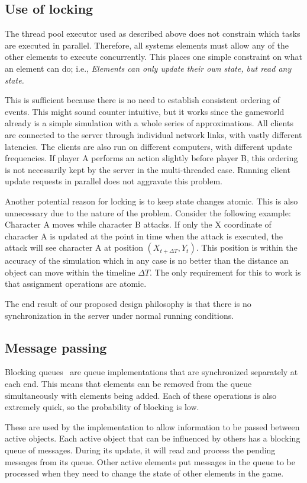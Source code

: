 \subsection{Use of locking}
The thread pool executor used as described above does not constrain
which tasks are executed in parallel. Therefore, all systems elements
must allow any of the other elements to execute concurrently. This
places one simple constraint on what an element can do; i.e., 
\emph{Elements can only update their own state, but read any state.}

This is sufficient because there is no need to establish consistent
ordering of events. This might sound counter intuitive, but it works since
the gameworld already is a simple simulation with a whole series of
approximations. All clients are connected to the server through
individual network links, with vastly different latencies.  The
clients are also run on different computers, with different update
frequencies. If player A performs an action slightly before player B,
this ordering is not necessarily kept by the server in the multi-threaded 
case. Running client update requests in parallel does not
aggravate this problem.

Another potential reason for locking is to keep state changes
atomic. This is also unnecessary due to the nature of the
problem. Consider the following example: Character A moves while
character B attacks. If only the X coordinate of character A is
updated at the point in time when the attack is executed, the attack
will see character A at position $(X_{t+\Delta T},Y_{t})$. This
position is within the accuracy of the simulation which in any case is
no better than the distance an object can move within the timeline $\Delta T$. The
only requirement for this to work is that assignment operations are
atomic.

The end result of our proposed design philosophy is that there is no
synchronization in the server under normal running conditions.

\subsection{Message passing}
Blocking queues~\cite{java:blockingqueue} are queue implementations
that are synchronized separately at each end. This means that elements
can be removed from the queue simultaneously with elements being
added. Each of these operations is also extremely quick, so the
probability of blocking is low.

These are used by the implementation to allow information to be passed
between active objects. Each active object that can be influenced by
others has a blocking queue of messages. During its update, it will
read and process the pending messages from its queue. Other active
elements put messages in the queue to be processed when they need to
change the state of other elements in the game.


